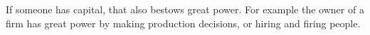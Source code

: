 If someone has capital, that also bestows great power. For example the owner of a firm has great power by making production decisions, or hiring and firing people.
